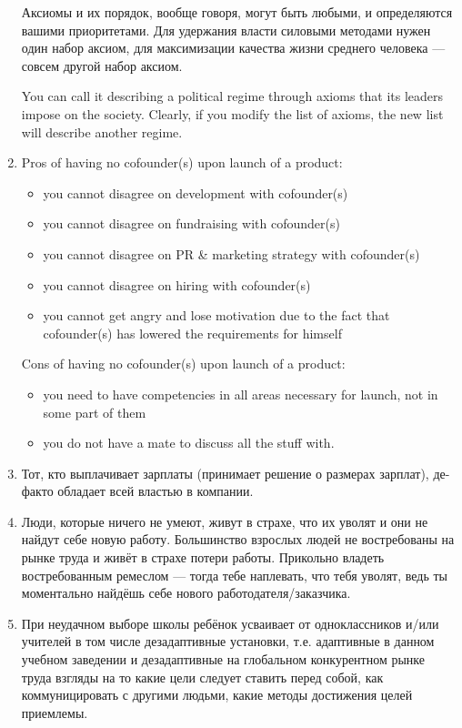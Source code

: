 \documentclass[11pt]{article}
\theoremstyle{remark}
\theoremstyle{definition}
\begin{document}
\begin{enumerate}
Аксиомы и их порядок, вообще говоря, могут быть любыми, и определяются вашими приоритетами. Для удержания власти силовыми методами нужен один набор аксиом, для максимизации качества жизни среднего человека --- совсем другой набор аксиом. 

You can call it describing a political regime through axioms that its leaders impose on the society. Clearly, if you modify the list of axioms, the new list will describe another regime.




\item Pros of having no cofounder(s) upon launch of a product:
\begin{itemize}
\item you cannot disagree on development with cofounder(s)
\item you cannot disagree on fundraising with cofounder(s)
\item you cannot disagree on PR \& marketing strategy with cofounder(s)
\item you cannot disagree on hiring with cofounder(s)
\item you cannot get angry and lose motivation due to the fact that cofounder(s) has lowered the requirements for himself
\end{itemize}

Cons of having no cofounder(s) upon launch of a product:
\begin{itemize}
\item you need to have competencies in all areas necessary for launch, not in some part of them
\item you do not have a mate to discuss all the stuff with.
\end{itemize}


\item Тот, кто выплачивает зарплаты (принимает решение о размерах зарплат), де-факто обладает всей властью в компании.


\item Люди, которые ничего не умеют, живут в страхе, что их уволят и они не найдут себе новую работу. Большинство взрослых людей не востребованы на рынке труда и живёт в страхе потери работы. Прикольно владеть востребованным ремеслом — тогда тебе наплевать, что тебя уволят, ведь ты моментально найдёшь себе нового работодателя/заказчика.

\item При неудачном выборе школы ребёнок усваивает от одноклассников и/или учителей в том числе дезадаптивные установки, т.е. адаптивные в данном учебном заведении и дезадаптивные на глобальном конкурентном рынке труда взгляды на то какие цели следует ставить перед собой, как коммуницировать с другими людьми, какие методы достижения целей приемлемы.


\end{enumerate}
\end{document}
